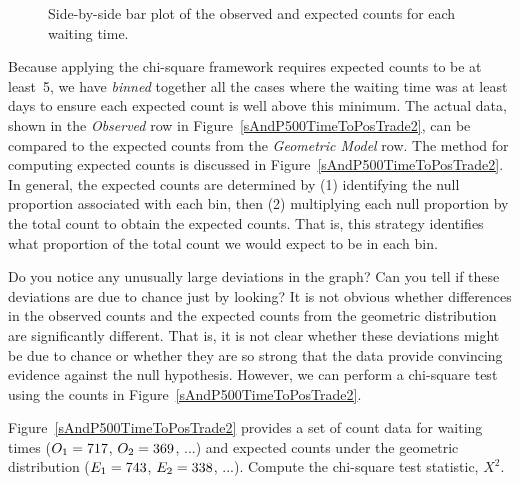 \begin{figure}
  \centering
  \caption{Side-by-side bar plot of the observed
      and expected counts for each waiting time.}
  \label{geomFitEvaluationForSP500}
\end{figure}

Because applying the chi-square framework requires expected counts to be at least~5, we have \emph{binned} together all the cases where the waiting time was at least \spdaysN{} days to ensure each expected count is well above this minimum. The actual data, shown in the \emph{Observed} row in Figure~\ref{sAndP500TimeToPosTrade2}, can be compared to the expected counts from the \emph{Geometric Model} row. The method for computing expected counts is discussed in Figure~\ref{sAndP500TimeToPosTrade2}. In general, the expected counts are determined by (1) identifying the null proportion associated with each bin, then (2) multiplying each null proportion by the total count to obtain the expected counts. That is, this strategy identifies what proportion of the total count we would expect to be in each bin.

\begin{examplewrap}
\begin{nexample}{Do you notice any unusually large deviations
    in the graph?
    Can you tell if these deviations are due to chance just
    by looking?}
  It is not obvious whether differences in the observed counts
  and the expected counts from the geometric distribution are
  significantly different.
  That is, it is not clear whether these deviations might be
  due to chance or whether they are so strong that the data
  provide convincing evidence against the null hypothesis.
  However, we can perform a chi-square test using the counts
  in Figure~\ref{sAndP500TimeToPosTrade2}.
\end{nexample}
\end{examplewrap}

\begin{exercisewrap}
\begin{nexercise}
Figure~\ref{sAndP500TimeToPosTrade2}
provides a set of count data for waiting times
($O_1=717{}$, $O_2=369{}$, ...)
and expected counts under the geometric distribution
($E_1=743{}$, $E_2=338{}$, ...).
Compute the chi-square test statistic, $X^2$.\footnotemark
\end{nexercise}
\end{exercisewrap}

